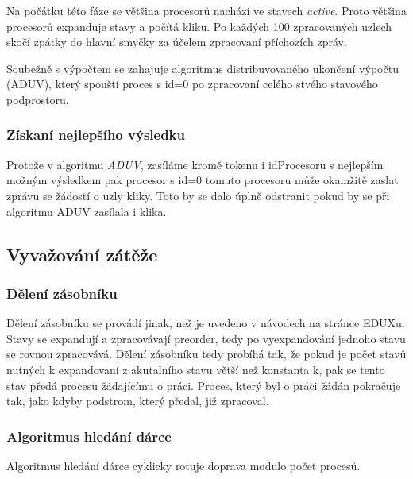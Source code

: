 \documentclass[11pt]{article}
\begin{document}
Na počátku této fáze se většina procesorů nachází ve stavech \textit{active}. Proto většina procesorů expanduje stavy a počítá kliku. Po každých 100 zpracovaných uzlech skočí zpátky do hlavní smyčky za účelem zpracovaní příchozích zpráv.

Soubežně s výpočtem se zahajuje algoritmus distribuvovaného ukončení výpočtu (ADUV), který spouští proces s id=0 po zpracovaní celého stvého stavového podprostoru.

\subsubsection{Získaní nejlepšího výsledku}
Protože v algoritmu \textit{ADUV}, zasíláme kromě tokenu i idProcesoru s nejlepším možným výsledkem pak procesor s id=0 tomuto procesoru může okamžitě zaslat zprávu se žádostí o uzly kliky. Toto by se dalo úplně odstranit pokud by se při algoritmu ADUV zasílala i klika.

\subsection{Vyvažování zátěže}
\subsubsection{Dělení zásobníku}
Dělení zásobníku se provádí jinak, než je uvedeno v návodech na stránce EDUXu. Stavy se expandují a zpracovávají preorder, tedy po vyexpandování jednoho stavu se rovnou zpracovává. Dělení zásobníku tedy probíhá tak, že pokud je počet stavů nutných k expandovaní z akutalního stavu větší než konstanta k, pak se tento stav předá procesu žádajícímu o práci. Proces, který byl o práci žádán pokračuje tak, jako kdyby podstrom, který předal, již zpracoval.

\subsubsection{Algoritmus hledání dárce}
Algoritmus hledání dárce cyklicky rotuje doprava modulo počet procesů.
\end{document}
